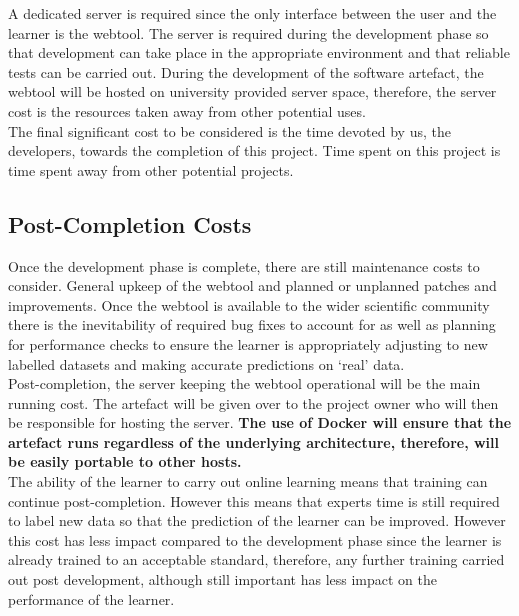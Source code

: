 \documentclass{ecmm427_assignment}
\begin{document}
\quad A dedicated server is required since the only interface between the user and the learner is the webtool. The server is required during the development phase so that development can take place in the appropriate environment and that reliable tests can be carried out. During the development of the software artefact, the webtool will be hosted on university provided server space, therefore, the server cost is the resources taken away from other potential uses.\\

\quad The final significant cost to be considered is the time devoted by us, the developers, towards the completion of this project. Time spent on this project is time spent away from other potential projects.

\subsection{Post-Completion Costs}
\quad Once the development phase is complete, there are still maintenance costs to consider. General upkeep of the webtool and planned or unplanned patches and improvements. Once the webtool is available to the wider scientific community there is the inevitability of required bug fixes to account for as well as planning for performance checks to ensure the learner is appropriately adjusting to new labelled datasets and making accurate predictions on ‘real’ data.\\

\quad Post-completion, the server keeping the webtool operational will be the main running cost. The artefact will be given over to the project owner who will then be responsible for hosting the server. \textbf{The use of Docker will ensure that the artefact runs regardless of the underlying architecture, therefore, will be easily portable to other hosts.}\\

\quad The ability of the learner to carry out online learning means that training can continue post-completion. However this means that experts time is still required to label new data so that the prediction of the learner can be improved. However this cost has less impact compared to the development phase since the learner is already trained to an acceptable standard, therefore, any further training carried out post development, although still important has less impact on the performance of the learner.\\
\end{document}

